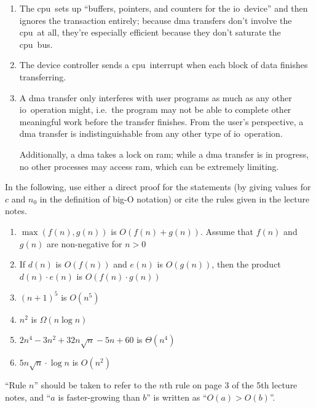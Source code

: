 \documentclass[gantt]{brandeis-problemset}
\newcommand{\io}{\ac{io}}
\newcommand{\cpu}{\ac{cpu}}
\begin{document}
\begin{enumerate}
	\item The \cpu\ sets up ``buffers, pointers, and counters for the
		\io\ device'' and then ignores the transaction entirely;
		because \ac{dma} transfers don't involve the \cpu\ at all,
		they're especially efficient because they don't saturate the
		\cpu\ bus.
	\item The device controller sends a \cpu\ interrupt when each block of
		data finishes transferring.
	\item A \ac{dma} transfer only interferes with user programs as much
		as any other \io\ operation might, i.e.\ the program may not
		be able to complete other meaningful work before the
		transfer finishes. From the user's perspective, a \ac{dma}
		transfer is indistinguishable from any other type of \io\
		operation.

		Additionally, a \ac{dma} takes a lock on \ac{ram}; while a
		\ac{dma} transfer is in progress, no other processes may
		access \ac{ram}, which can be extremely limiting.
\end{enumerate}

\begin{problem}
	In the following, use either a direct proof for the statements (by
	giving values for $c$ and $n_0$ in the definition of big-O notation)
	or cite the rules given in the lecture notes.

	\begin{enumerate}
		\item $\max(f(n), g(n))$ is $O(f(n) + g(n))$. Assume that $f(n)$
			and $g(n)$ are non-negative for $n > 0$
		\item  If $d(n)$ is $O(f(n))$ and $e(n)$ is $O(g(n))$, then
			the product $d(n) \cdot e(n)$ is $O(f(n) \cdot g(n))$
		\item $(n + 1)^5$ is $O(n^5)$
		\item $n^2$ is $\Omega(n\log n)$
		\item $2n^4 - 3n^2 + 32n\sqrt n - 5n + 60$ is $\Theta(n^4)$
		\item $5n\sqrt n \cdot \log n$ is $O(n^2)$
	\end{enumerate}
\end{problem}

``Rule $n$'' should be taken to refer to the $n$th rule on page 3 of the 5th
lecture notes, and ``$a$ is faster-growing than $b$'' is written as ``$O(a)
> O(b)$''.
\end{document}
